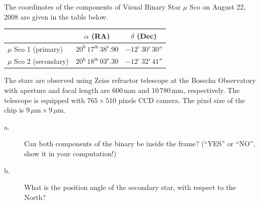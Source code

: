 The coordinates of the components of Visual Binary Star $\mu$ Sco on August 22,
2008 are given in the table below.

\begin{center}
\begin{tabular}{|l|c|c|}
\hline
 & $\alpha$ (RA) & $\delta$ (Dec) \\
\hline
$\mu$ Sco 1 (primary) & $20^{\mathrm{h}}\,17^{\mathrm{m}}\,38^{\mathrm{s}}\!.90$
  & $-12^\circ\,30'\,30''$ \\
\hline
$\mu$ Sco 2 (secondary) &
  $20^{\mathrm{h}}\,18^{\mathrm{m}}\,03^{\mathrm{s}}\!.30$
  & $-12^\circ\,32'\,41''$ \\
\hline
\end{tabular}
\end{center}

The stars are observed using Zeiss refractor telescope at the Bosscha
Observatory with aperture and focal length are 600\,mm and 10\,780\,mm,
respectively. The telescope is equipped with $765 \times 510$ pixels CCD
camera. The pixel size of the chip is
$9\,\mu\mathrm{m} \times 9\,\mu\mathrm{m}$.

\begin{description}
\item[a.] Can both components of the binary be inside the frame? (``YES'' or
  ``NO'', show it in your computation!)
\item[b.] What is the position angle of the secondary star, with respect to the
  North?
\end{description}
